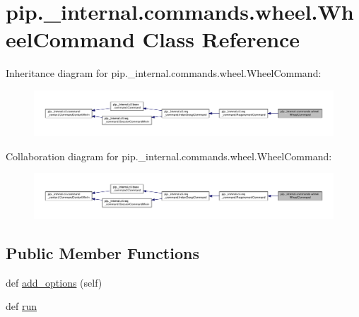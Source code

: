 \hypertarget{classpip_1_1__internal_1_1commands_1_1wheel_1_1WheelCommand}{}\section{pip.\+\_\+internal.\+commands.\+wheel.\+Wheel\+Command Class Reference}
\label{classpip_1_1__internal_1_1commands_1_1wheel_1_1WheelCommand}


Inheritance diagram for pip.\+\_\+internal.\+commands.\+wheel.\+Wheel\+Command\+:
\nopagebreak
\begin{figure}[H]
\begin{center}
\leavevmode
\includegraphics[width=350pt]{classpip_1_1__internal_1_1commands_1_1wheel_1_1WheelCommand__inherit__graph}
\end{center}
\end{figure}


Collaboration diagram for pip.\+\_\+internal.\+commands.\+wheel.\+Wheel\+Command\+:
\nopagebreak
\begin{figure}[H]
\begin{center}
\leavevmode
\includegraphics[width=350pt]{classpip_1_1__internal_1_1commands_1_1wheel_1_1WheelCommand__coll__graph}
\end{center}
\end{figure}
\subsection*{Public Member Functions}
\begin{DoxyCompactItemize}
\item 
def \hyperlink{classpip_1_1__internal_1_1commands_1_1wheel_1_1WheelCommand_a04be79614f64a032f237dc02f4750021}{add\+\_\+options} (self)
\item 
def \hyperlink{classpip_1_1__internal_1_1commands_1_1wheel_1_1WheelCommand_a93a8891036b50e02a2bcdbd5ff6890c1}{run}
\end{DoxyCompactItemize}
